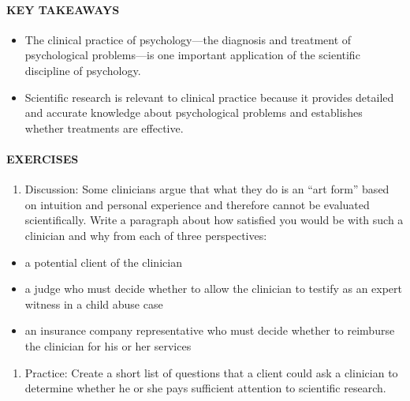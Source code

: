 \documentclass[
]{krantz}
\providecommand{\tightlist}{%
  \setlength{\itemsep}{0pt}\setlength{\parskip}{0pt}}
\begin{document}
\paragraph*{KEY TAKEAWAYS}\label{key-takeaways-3}

\begin{itemize}
\tightlist
\item
  The clinical practice of psychology---the diagnosis and treatment of psychological problems---is one important application of the scientific discipline of psychology.
\item
  Scientific research is relevant to clinical practice because it provides detailed and accurate knowledge about psychological problems and establishes whether treatments are effective.
\end{itemize}

\paragraph*{EXERCISES}\label{exercises-3}

\begin{enumerate}
\def\labelenumi{\arabic{enumi}.}
\tightlist
\item
  Discussion: Some clinicians argue that what they do is an ``art form'' based on intuition and personal experience and therefore cannot be evaluated scientifically. Write a paragraph about how satisfied you would be with such a clinician and why from each of three perspectives:
\end{enumerate}

\begin{itemize}
\tightlist
\item
  a potential client of the clinician
\item
  a judge who must decide whether to allow the clinician to testify as an expert witness in a child abuse case
\item
  an insurance company representative who must decide whether to reimburse the clinician for his or her services
\end{itemize}

\begin{enumerate}
\def\labelenumi{\arabic{enumi}.}
\setcounter{enumi}{1}
\tightlist
\item
  Practice: Create a short list of questions that a client could ask a clinician to determine whether he or she pays sufficient attention to scientific research.
\end{enumerate}
\end{document}
